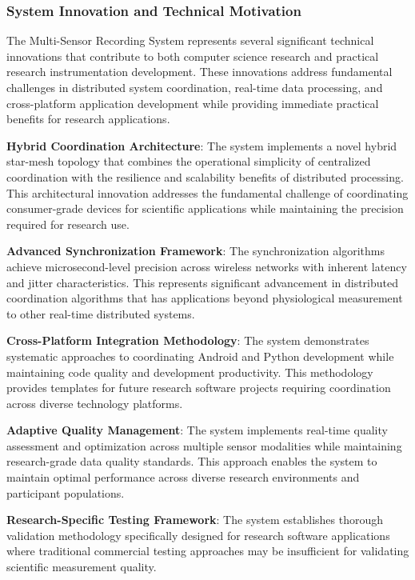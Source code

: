 \documentclass[11pt,a4paper]{article}
\begin{document}
\subsubsection{System Innovation and Technical Motivation}

The Multi-Sensor Recording System represents several significant technical
innovations that contribute to both computer
science research and practical research instrumentation development. These
innovations address fundamental challenges in
distributed system coordination, real-time data processing, and cross-platform
application development while providing
immediate practical benefits for research applications.

\textbf{Hybrid Coordination Architecture}: The system implements a novel hybrid star-mesh topology that combines the
operational simplicity of centralized coordination with the resilience and
scalability benefits of distributed
processing. This architectural innovation addresses the fundamental challenge of
coordinating consumer-grade devices for
scientific applications while maintaining the precision required for research
use.

\textbf{Advanced Synchronization Framework}: The synchronization algorithms achieve microsecond-level precision across
wireless networks with inherent latency and jitter characteristics. This
represents significant advancement in
distributed coordination algorithms that has applications beyond physiological
measurement to other real-time
distributed systems.

\textbf{Cross-Platform Integration Methodology}: The system demonstrates systematic approaches to coordinating Android and
Python development while maintaining code quality and development productivity.
This methodology provides templates for
future research software projects requiring coordination across diverse
technology platforms.

\textbf{Adaptive Quality Management}: The system implements real-time quality assessment and optimization across multiple
sensor modalities while maintaining research-grade data quality standards. This
approach enables the system to maintain
optimal performance across diverse research environments and participant
populations.

\textbf{Research-Specific Testing Framework}: The system establishes thorough validation methodology specifically
designed for research software applications where traditional commercial testing
approaches may be insufficient for
validating scientific measurement quality.
\end{document}
